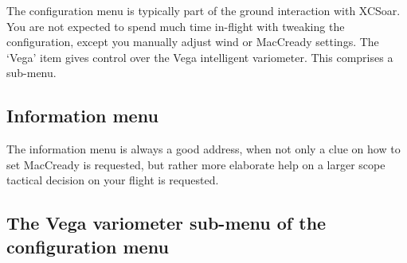 The configuration menu is typically part of the ground interaction with 
XCSoar. You are not expected to spend much time in-flight with tweaking 
the configuration, except you manually adjust wind or MacCready settings. 
The `Vega' item gives control over the  Vega intelligent variometer. This 
comprises a sub-menu.


\subsection*{Information menu}
\noindent{}

The information menu is always a good address, when not only a clue on 
how to set MacCready is requested, but rather more elaborate help on a 
larger scope tactical decision on your flight is requested. %


\subsection*{The Vega variometer sub-menu of the configuration menu}
\noindent{}

